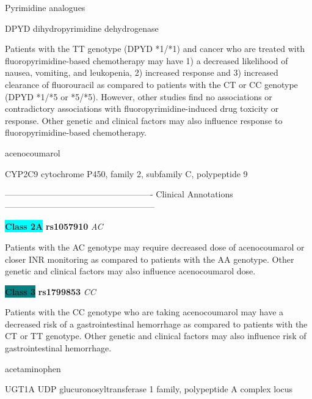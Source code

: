 \documentclass{resume} %
\begin{document}
\begin{rSection}{ Pyrimidine analogues }
\begin{rSubsection}{ DPYD }{ dihydropyrimidine dehydrogenase }{}{}
\item[] Patients with the TT genotype (DPYD *1/*1) and cancer who are treated with fluoropyrimidine-based chemotherapy may have 1) a decreased likelihood of nausea, vomiting, and leukopenia, 2) increased response and 3) increased clearance of fluorouracil as compared to patients with the CT or CC genotype (DPYD *1/*5 or *5/*5). However, other studies find no associations or contradictory associations with fluoropyrimidine-induced drug toxicity or response. Other genetic and clinical factors may also influence response to fluoropyrimidine-based chemotherapy.
\end{rSubsection}

\end{rSection}\begin{rSection}{ acenocoumarol }
\item[]

\begin{rSubsection}{ CYP2C9 }{ cytochrome P450, family 2, subfamily C, polypeptide 9 }{}{}
\item[]

\item[] ---------------------------------------------------- Clinical Annotations -----------------------------------------------------\newline
\item \textbf{\colorbox{cyan} {Class 2A}} \textbf{ rs1057910 } \textit{ AC }
\item[] Patients with the AC genotype may require decreased dose of acenocoumarol or closer INR monitoring as compared to patients with the AA genotype. Other genetic and clinical factors may also influence acenocoumarol dose.\item \textbf{\colorbox{teal} {Class 3}} \textbf{ rs1799853 } \textit{ CC }
\item[] Patients with the CC genotype who are taking acenocoumarol may have a decreased risk of a gastrointestinal hemorrhage as compared to patients with the CT or TT genotype. Other genetic and clinical factors may also influence risk of gastrointestinal hemorrhage.
\end{rSubsection}

\end{rSection}\begin{rSection}{ acetaminophen }
\item[]

\begin{rSubsection}{ UGT1A }{ UDP glucuronosyltransferase 1 family, polypeptide A complex locus }{}{}
\item[]


\end{rSubsection}
\end{rSection}
\end{document}
